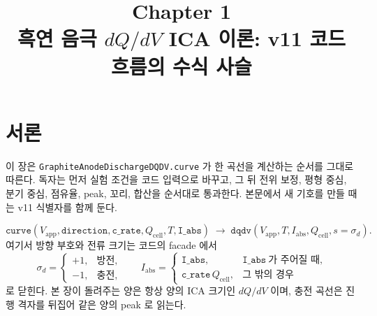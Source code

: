 \documentclass[11pt,a4paper]{article}
\title{\textbf{\LARGE Chapter 1}\\[0.35em]\Large 흑연 음극 $dQ/dV$ ICA 이론: v11 코드 흐름의 수식 사슬}
\author{}
\date{}
\newcommand{\app}{\mathrm{app}}
\newcommand{\cellc}{\mathrm{cell}}
\newcommand{\abs}{\mathrm{abs}}
\begin{document}
\maketitle

\section*{서론}
이 장은 \texttt{GraphiteAnodeDischargeDQDV.curve} 가 한 곡선을 계산하는 순서를 그대로 따른다. 독자는 먼저 실험 조건을 코드 입력으로 바꾸고, 그 뒤 전위 보정, 평형 중심, 분기 중심, 점유율, peak, 꼬리, 합산을 순서대로 통과한다. 본문에서 새 기호를 만들 때는 v11 식별자를 함께 둔다.

\begin{equation}
\texttt{curve}(V_{\app},\texttt{direction},\texttt{c\_rate},Q_{\cellc},T,\texttt{I\_abs})
\;\longrightarrow\;
\texttt{dqdv}(V_{\app},T,I_{\abs},Q_{\cellc},s=\sigma_d).
\label{eq:entry}
\end{equation}
여기서 방향 부호와 전류 크기는 코드의 facade 에서
\begin{equation}
\sigma_d=
\begin{cases}
+1,&\text{방전},\\
-1,&\text{충전},
\end{cases}
\qquad
I_{\abs}=
\begin{cases}
\texttt{I\_abs},&\texttt{I\_abs}\ \text{가 주어질 때},\\
\texttt{c\_rate}\,Q_{\cellc},&\text{그 밖의 경우}
\end{cases}
\label{eq:facade}
\end{equation}
로 닫힌다. 본 장이 돌려주는 양은 항상 양의 ICA 크기인 $dQ/dV$ 이며, 충전 곡선은 진행 격자를 뒤집어 같은 양의 peak 로 읽는다.
\end{document}
